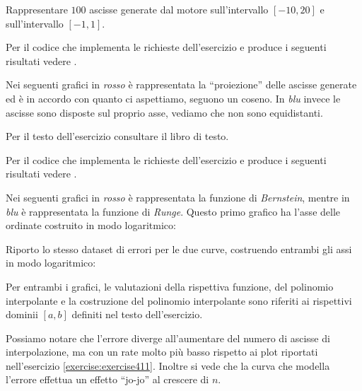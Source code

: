 \begin{exercise}
Rappresentare $100$ ascisse generate dal motore
 sull'intervallo $[-10, 20]$ e
sull'intervallo $[-1, 1]$.
\end{exercise}
Per il codice che implementa le richieste dell'esercizio e produce i seguenti
risultati vedere .

Nei seguenti grafici in
\emph{rosso} \`e rappresentata la ``proiezione'' delle ascisse generate ed \`e
in accordo con quanto ci aspettiamo, seguono un coseno. In \emph{blu} invece le
ascisse sono disposte sul proprio asse, vediamo che non sono equidistanti.
\begin{center}   

\end{center}
\begin{center}   

\end{center}

\begin{exercise}[4.15]
Per il testo dell'esercizio consultare il libro di testo.
\end{exercise}
Per il codice che implementa le richieste dell'esercizio e produce i seguenti
risultati vedere .

Nei seguenti grafici in
\emph{rosso} \`e rappresentata la funzione di \emph{Bernstein}, mentre in 
\emph{blu} \`e rappresentata la funzione di \emph{Runge}. Questo primo grafico
ha l'asse delle ordinate costruito in modo logaritmico:
\begin{center}   

\end{center}
Riporto lo stesso dataset di errori per le due curve, costruendo entrambi gli
assi in modo logaritmico:
\begin{center}  

\end{center}
Per entrambi i grafici, le valutazioni della rispettiva funzione, del polinomio
interpolante e la costruzione del polinomio interpolante sono riferiti ai
rispettivi dominii $[a,b]$ definiti nel testo dell'esercizio. 

Possiamo notare che l'errore diverge all'aumentare del numero di ascisse di
interpolazione, ma con un rate molto pi\`u basso rispetto ai plot riportati
nell'esercizio \ref{exercise:exercise411}. Inoltre si vede che la curva
che modella l'errore effettua un effetto ``jo-jo'' al crescere di $n$.
